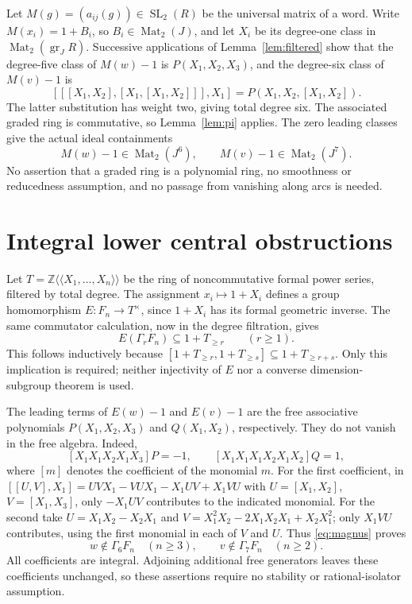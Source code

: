 \documentclass[11pt,letterpaper]{article}
\newcommand{\Mat}{\operatorname{Mat}}
\newcommand{\SL}{\operatorname{SL}}
\newcommand{\Z}{\mathbb{Z}}
\begin{document}
Let $M(g)=(a_{ij}(g))\in\SL_2(R)$ be the universal matrix of a word.
Write $M(x_i)=1+B_i$, so $B_i\in\Mat_2(J)$, and let $X_i$ be its
degree-one class in $\Mat_2(\operatorname{gr}_J R)$.
Successive applications of Lemma~\ref{lem:filtered} show that the degree-five
class of $M(w)-1$ is $P(X_1,X_2,X_3)$, and the degree-six class of
$M(v)-1$ is
\[
 [[[X_1,X_2],[X_1,[X_1,X_2]]],X_1]
   =P(X_1,X_2,[X_1,X_2]).
\]
The latter substitution has weight two, giving total degree six.
The associated graded ring is commutative, so Lemma~\ref{lem:pi} applies.
The zero leading classes give the actual ideal containments
\begin{equation}\label{eq:ideal}
 M(w)-1\in\Mat_2(J^6),\qquad
 M(v)-1\in\Mat_2(J^7).
\end{equation}
No assertion that a graded ring is a polynomial ring, no smoothness or
reducedness assumption, and no passage from vanishing along arcs is needed.

\section{Integral lower central obstructions}
Let $T=\Z\langle\!\langle X_1,\ldots,X_n\rangle\!\rangle$ be the ring
of noncommutative formal power series, filtered by total degree.
The assignment $x_i\mapsto1+X_i$ defines a group homomorphism
$E:F_n\to T^\times$, since $1+X_i$ has its formal geometric inverse.
The same commutator calculation, now in the degree filtration, gives
\begin{equation}\label{eq:magnus}
 E(\Gamma_rF_n)\subseteq1+T_{\geq r}
 \qquad(r\geq1).
\end{equation}
This follows inductively because $[1+T_{\geq r},1+T_{\geq s}]
\subseteq1+T_{\geq r+s}$. Only this implication is required; neither
injectivity of $E$ nor a converse dimension-subgroup theorem is used.

The leading terms of $E(w)-1$ and $E(v)-1$ are the free associative
polynomials $P(X_1,X_2,X_3)$ and $Q(X_1,X_2)$, respectively. They do
not vanish in the free algebra. Indeed,
\begin{equation}\label{eq:coeff}
 [X_1X_1X_2X_1X_3]P=-1,\qquad
 [X_1X_1X_1X_2X_1X_2]Q=1,
\end{equation}
where $[m]$ denotes the coefficient of the monomial $m$.
For the first coefficient, in
$[[U,V],X_1]=UVX_1-VUX_1-X_1UV+X_1VU$ with
$U=[X_1,X_2]$, $V=[X_1,X_3]$, only $-X_1UV$ contributes to the
indicated monomial. For the second take
$U=X_1X_2-X_2X_1$ and
$V=X_1^2X_2-2X_1X_2X_1+X_2X_1^2$; only $X_1VU$ contributes,
using the first monomial in each of $V$ and $U$.
Thus \eqref{eq:magnus} proves
\begin{equation}\label{eq:nonmember}
 w\notin\Gamma_6F_n\quad(n\geq3),\qquad
 v\notin\Gamma_7F_n\quad(n\geq2).
\end{equation}
All coefficients are integral. Adjoining additional free generators leaves
these coefficients unchanged, so these assertions require no stability
or rational-isolator assumption.
\end{document}
